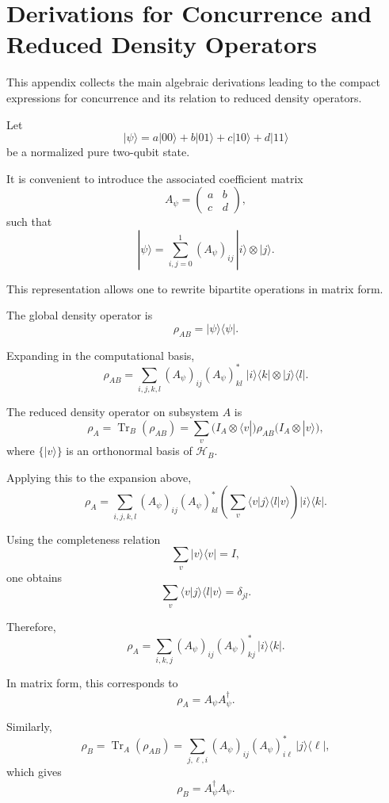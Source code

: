 \documentclass[a4paper]{article}
\begin{document}
\section{Derivations for Concurrence and Reduced Density Operators}

This appendix collects the main algebraic derivations leading to the compact expressions for concurrence and its relation to reduced density operators.

Let
\[
|\psi\rangle
=
a|00\rangle + b|01\rangle + c|10\rangle + d|11\rangle
\]
be a normalized pure two-qubit state.

It is convenient to introduce the associated coefficient matrix
\[
A_\psi =
\begin{pmatrix}
a & b\\
c & d
\end{pmatrix},
\]
such that
\[
|\psi\rangle
=
\sum_{i,j=0}^{1} (A_\psi)_{ij}\,|i\rangle \otimes |j\rangle.
\]

This representation allows one to rewrite bipartite operations in matrix form.

The global density operator is
\[
\rho_{AB} = |\psi\rangle\langle\psi|.
\]

Expanding in the computational basis,
\[
\rho_{AB}
=
\sum_{i,j,k,l}
(A_\psi)_{ij}(A_\psi)^*_{kl}
\;
|i\rangle\langle k|
\otimes
|j\rangle\langle l|.
\]

The reduced density operator on subsystem \(A\) is
\[
\rho_A = \operatorname{Tr}_B(\rho_{AB})
=
\sum_v
\bigl(I_A \otimes \langle v|\bigr)
\rho_{AB}
\bigl(I_A \otimes |v\rangle\bigr),
\]
where \(\{|v\rangle\}\) is an orthonormal basis of \(\mathcal{H}_B\).

Applying this to the expansion above,
\[
\rho_A
=
\sum_{i,j,k,l}
(A_\psi)_{ij}(A_\psi)^*_{kl}
\left(
\sum_v \langle v|j\rangle \langle l|v\rangle
\right)
|i\rangle\langle k|.
\]

Using the completeness relation
\[
\sum_v |v\rangle\langle v| = I,
\]
one obtains
\[
\sum_v \langle v|j\rangle \langle l|v\rangle = \delta_{jl}.
\]

Therefore,
\[
\rho_A
=
\sum_{i,k,j}
(A_\psi)_{ij}(A_\psi)^*_{kj}
\,|i\rangle\langle k|.
\]

In matrix form, this corresponds to
\[
\rho_A = A_\psi A_\psi^\dagger.
\]

Similarly,
\[
\rho_B = \operatorname{Tr}_A(\rho_{AB})
=
\sum_{j,\ell,i}
(A_\psi)_{ij}(A_\psi)^*_{i\ell}
\,|j\rangle\langle \ell|,
\]
which gives
\[
\rho_B = A_\psi^\dagger A_\psi.
\]
\end{document}
